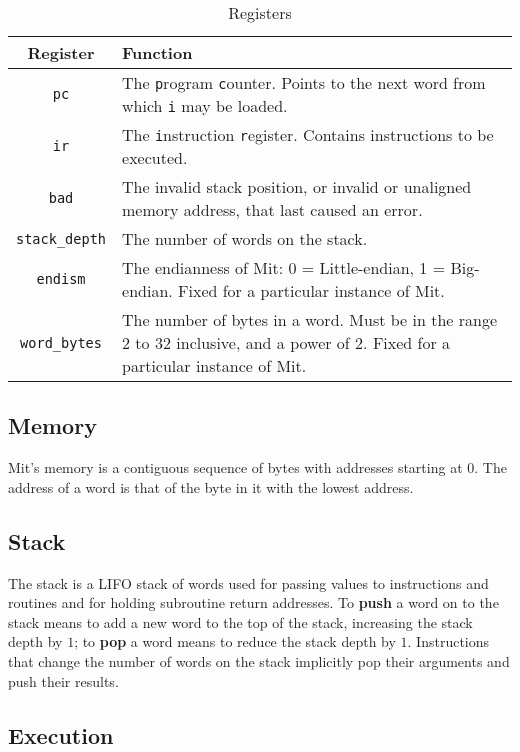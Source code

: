 \documentclass[a4paper]{article}
\begin{document}
\begin{table}[htbp]
\begin{center}
\begin{tabular}{cp{3.75in}} \toprule
\bf Register & \bf Function \\
 \midrule
{\tt pc} & The {\tt p}rogram {\tt c}ounter. Points to the next word from which {\tt i} may be loaded. \\
{\tt ir} & The {\tt i}nstruction {\tt r}egister. Contains instructions to be executed. \\
{\tt bad} & The invalid stack position, or invalid or unaligned memory address, that last caused an error. \\
{\tt stack\_depth} & The number of words on the stack. \\
{\tt endism} & The endianness of Mit: 0 = Little-endian, 1 = Big-endian. Fixed for a particular instance of Mit. \\
{\tt word\_bytes} & The number of bytes in a word. Must be in the range $2$ to $32$ inclusive, and a power of $2$. Fixed for a particular instance of Mit. \\
 \bottomrule
\end{tabular}
\caption{\label{regtable}Registers}
\end{center}
\end{table}


\subsection{Memory}

Mit's memory is a contiguous sequence of bytes with addresses
starting at $0$. The address of a word is that of the byte in it with the
lowest address.


\subsection{Stack}

The stack is a LIFO stack of words used for passing values to instructions and routines and for holding subroutine return addresses. To {\bf push} a word on to the stack means to add a new word to the top of the stack, increasing the stack depth by $1$; to {\bf pop} a word means to reduce the stack depth by $1$. Instructions that change the number of words on the stack implicitly pop their arguments and push their results.


\subsection{Execution}
\label{execution}
\end{document}
